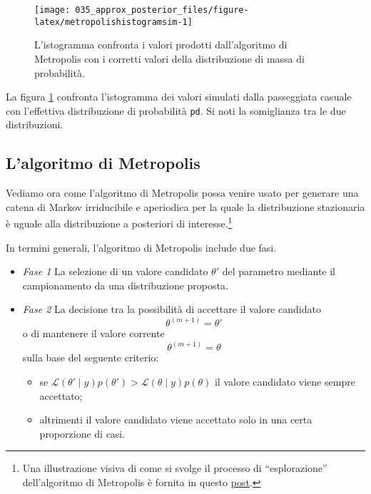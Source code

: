 \documentclass[
]{memoir}
\providecommand{\tightlist}{%
  \setlength{\itemsep}{0pt}\setlength{\parskip}{0pt}}
\begin{document}
\begin{figure}

{\centering \texttt{[image: 035\_approx\_posterior\_files/figure-latex/metropolishistogramsim-1]} 

}

\caption{L'istogramma confronta i valori prodotti dall'algoritmo di Metropolis con i corretti valori della distribuzione di massa di probabilità.}\label{fig:metropolishistogramsim}
\end{figure}

\noindent
La figura \ref{fig:metropolishistogramsim} confronta l'istogramma dei valori simulati dalla passeggiata casuale con l'effettiva distribuzione di probabilità \texttt{pd}. Si noti la somiglianza tra le due distribuzioni.

\hypertarget{lalgoritmo-di-metropolis}{%
\subsection{L'algoritmo di Metropolis}\label{lalgoritmo-di-metropolis}}

Vediamo ora come l'algoritmo di Metropolis possa venire usato per generare una catena di Markov irriducibile e aperiodica per la quale la distribuzione stazionaria è uguale alla distribuzione a posteriori di interesse.\footnote{Una illustrazione visiva di come si svolge il processo di ``esplorazione'' dell'algoritmo di Metropolis è fornita in questo \href{https://elevanth.org/blog/2017/11/28/build-a-better-markov-chain/}{post}.}

In termini generali, l'algoritmo di Metropolis include due fasi.

\begin{itemize}
\tightlist
\item
  \emph{Fase 1} La selezione di un valore candidato \(\theta'\) del parametro mediante il campionamento da una distribuzione proposta.
\item
  \emph{Fase 2} La decisione tra la possibilità di accettare il valore candidato
  \[
  \theta^{(m+1)} = \theta'
  \]
  \noindent
  o di mantenere il valore corrente
  \[
  \theta^{(m+1)} = \theta
  \]
  \noindent
  sulla base del seguente criterio:

  \begin{itemize}
  \tightlist
  \item
    se \(\mathcal{L}(\theta' \mid y)p(\theta') > \mathcal{L}(\theta \mid y)p(\theta)\) il valore candidato viene sempre accettato;
  \item
    altrimenti il valore candidato viene accettato solo in una certa proporzione di casi.
  \end{itemize}
\end{itemize}
\end{document}
